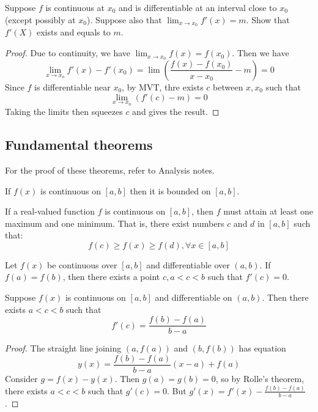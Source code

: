\documentclass[11pt]{article}
\begin{document}
\begin{exercise}
  Suppose \(f\) is continuous at \(x_0\) and is differentiable at an interval close to \(x_0\) (except possibly at \(x_0\)). Suppose also that \(\lim_{x\to x_0}f'(x)=m\). Show that \(f'(X)\) exists and equals to \(m\).
\end{exercise}
\begin{proof}
  Due to continuity, we have \(\lim_{x\to x_0}f(x)=f(x_0)\). Then we have \[\lim_{x\to x_o}f'(x)-f'(x_0)=\lim\left(\frac{f(x)-f(x_0)}{x-x_0}-m\right)=0\]
  Since \(f\) is differentiable near \(x_0\), by MVT, thre exists \(c\) between \(x,x_0\) such that \[\lim_{x\to x_0}(f'(c)-m)=0\]
  Taking the limits then squeezes \(c\) and gives the result.
\end{proof}

\subsection{Fundamental theorems}
For the proof of these theorems, refer to Analysis notes.

\begin{theorem}
  If \(f(x)\) is continuous on \([a,b]\) then it is bounded on \([a,b]\).
\end{theorem}

\begin{theorem}
  If a real-valued function \(f\) is continuous on \([a,b]\), then \(f\) must attain at least one maximum and one minimum. That is, there exist numbers \(c\) and \(d\) in \([a,b]\) such that:
  \[f(c)\geq f(x) \geq f(d), \forall x\in[a,b]\]
\end{theorem}

\begin{theorem}
  Let \(f(x)\) be continuous over \([a,b]\) and differentiable over \((a,b)\). If \(f(a)=f(b)\), then there exists a point \(c, a<c<b\) such that \(f'(c)=0\).
\end{theorem}

\begin{theorem}
  Suppose \(f(x)\) is continuous on \([a,b]\) and differentiable on \((a,b)\). Then there exists \(a < c < b\) such that 
  \begin{equation*}
    f'(c)=\frac{f(b)-f(a)}{b-a}
  \end{equation*}
\end{theorem}
\begin{proof}
  The straight line joining \((a,f(a))\) and \((b,f(b))\) has equation
  \begin{equation*}
    y(x)=\frac{f(b)-f(a)}{b-a} (x-a)+f(a)
  \end{equation*}
  Consider \(g = f(x) - y(x)\). Then \(g(a)=g(b)=0\), so by Rolle's theorem, there exists \(a<c<b\) such that \(g'(c)=0\).
  But \(g'(x)=f'(x)-\frac{f(b)-f(a)}{b-a}\).
\end{proof}
\end{document}
